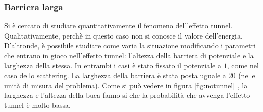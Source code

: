  \subsubsection{Barriera larga}
 Si è cercato di studiare quantitativamente il fenomeno dell'effetto tunnel. Qualitativamente, perchè in questo caso non si conosce il valore dell'energia.
 D'altronde, è possibile studiare come varia la situazione modificando i parametri che entrano in gioco nell'effetto tunnel: l'altezza della barriera di potenziale e la larghezza della stessa.
 In entrambi i casi è stato fissato il potenziale a $1$, come nel caso dello scattering.
 La larghezza della barriera è stata posta uguale a 20 (nelle unità di misura del problema). Come si può vedere in figura
 \ref{fig:notunnel} , la larghezza e l'altezza della buca fanno si che la probabilità che avvenga l'effetto tunnel è molto bassa.
